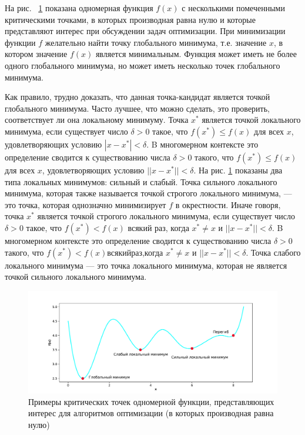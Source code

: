 На рис. ~\ref{fig:figure_4} показана одномерная функция $f(x)$ с несколькими помеченными критическими точками, в которых производная равна нулю и которые представляют интерес при обсуждении задач оптимизации. При минимизации функции $f$ желательно найти точку глобального минимума, т.е. значение $x$, в котором значение $f(x)$ является минимальным. Функция может иметь не более одного глобального минимума, но может иметь несколько точек глобального минимума.

Как правило, трудно доказать, что данная точка-кандидат является точкой глобального минимума. Часто лучшее, что можно сделать, это проверить, соответствует ли она локальному минимуму. Точка $x^*$ является точкой локального минимума, если существует число $\delta > 0$ такое, что $f(x^*) \leq f(x)$ для всех $x$, удовлетворяющих условию $| x - x^*| < \delta$. B многомерном контексте это определение сводится к существованию числа $\delta > 0$ такого, что $f(x^*) \leq f (x)$ для всех $x$, удовлетворяющих условию $||x - x^*|| < \delta$.
На рис. \ref{fig:figure_4} показаны два типа локальных минимумов: сильный и слабый. Точка сильного локального минимума, которая также называется точкой строгого локального минимума, — это точка, которая однозначно минимизирует $f$ в окрестности. Иначе говоря, точка $x^*$ является точкой строгого локального минимума, если существует число $\delta > 0$ такое, что $f(x^*) < f(x)$ всякий раз, когда $x^* \neq x$ и $||x - x^*|| < \delta$. B многомерном контексте это определение сводится к существованию числа $\delta > 0$ такого, что $f(x^*)< f(x)$всякийраз,когда $x^* \neq x$ и $||x - x^*||< \delta$. Точка слабого локального минимума — это точка локального минимума, которая не является точкой сильного локального минимума.

\begin{figure}[ht]
 \centering
		\includegraphics[height =7 cm, keepaspectratio]{../assets/images/Figure_4.pdf}
		\caption{Примеры критических точек одномерной функции, представляющих интерес для алгоритмов оптимизации (в которых производная равна нулю)}
		\label{fig:figure_4}
	\end{figure}
    
